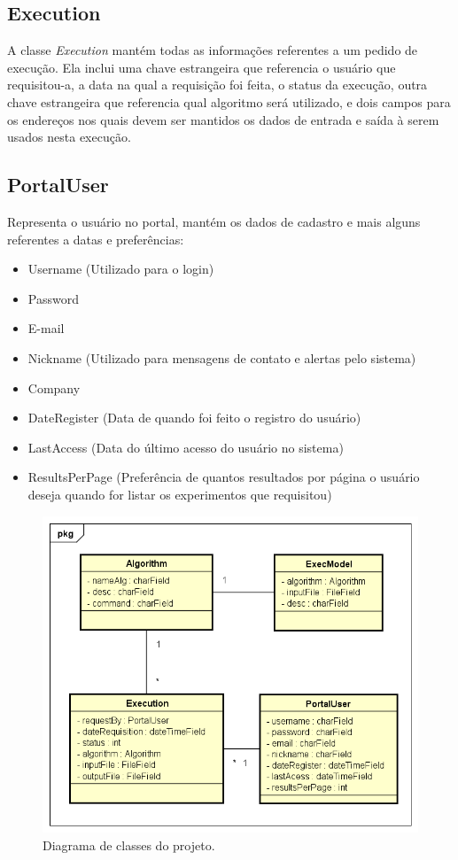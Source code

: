 \documentclass[tg]{mdtufsm}
\begin{document}
\subsection{Execution}
A classe \emph{Execution} mantém todas as informações referentes a um pedido de execução. Ela inclui uma chave estrangeira que referencia o usuário que requisitou-a, a data na qual a requisição foi feita, o status da execução, outra chave estrangeira que referencia qual algoritmo será utilizado, e dois campos para os endereços nos quais devem ser mantidos os dados de entrada e saída à serem usados nesta execução.

\subsection{PortalUser}
Representa o usuário no portal, mantém os dados de cadastro e mais alguns referentes a datas e preferências:

\begin{itemize}
	\item Username (Utilizado para o login)
	\item Password 
	\item E-mail
	\item Nickname (Utilizado para mensagens de contato e alertas pelo sistema)
	\item Company
	\item DateRegister (Data de quando foi feito o registro do usuário)
	\item LastAccess (Data do último acesso do usuário no sistema)
	\item ResultsPerPage (Preferência de quantos resultados por página o usuário deseja quando for listar os experimentos que requisitou)
\end{itemize}

\begin{figure}
	\centering
	\includegraphics[width=1\textwidth]{class_diagran_tg}
	\caption{
		Diagrama de classes do projeto.
	}
	\label{fig:classdiagram}
\end{figure}
\end{document}
